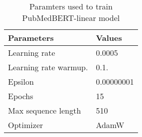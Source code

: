 \documentclass[10.7pt,]{article}
\begin{document}
\begin{table}[ht]
\centering
\begin{tabular}{|l|l|}
\hline
Parameters               & Values                            \\
\hline
Learning rate           & 0.0005                             \\
Learning rate warmup.   & 0.1.                               \\
Epsilon                 & 0.00000001                         \\
Epochs                  & 15                                 \\
Max sequence length     & 510                                \\
Optimizer               & AdamW                              \\
\hline
\end{tabular}
\caption{\label{ws:params} Paramters used to train PubMedBERT-linear model}
\end{table}
%
%
%
%
%
\end{document}
